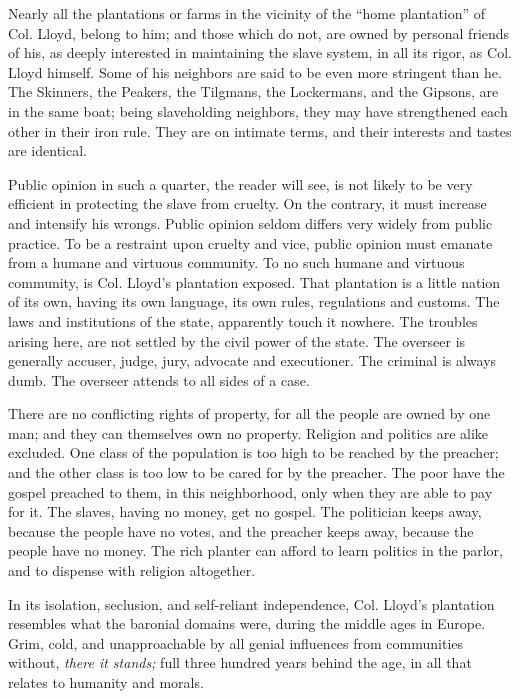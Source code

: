 Nearly all the plantations or farms in the vicinity of the ``home
plantation'' of Col. Lloyd, belong to him; and those which do not, are
owned by personal friends of his, as deeply interested in maintaining
the slave system, in all its rigor, as Col. Lloyd himself. Some of his
neighbors are said to be even more stringent than he. The Skinners, the
Peakers, the Tilgmans, the Lockermans, and the Gipsons, are in the same
boat; being slaveholding neighbors, they may have strengthened each
other in their iron rule. They are on intimate terms, and their
interests and tastes are identical.

Public opinion in such a quarter, the reader will see, is not likely to
be very efficient in protecting the slave from cruelty. On the contrary,
it must increase and intensify his wrongs. Public opinion seldom differs
very widely from public practice. To be a restraint upon cruelty and
vice, public opinion must emanate from a humane and virtuous community.
To no such {\protect\hypertarget{64}{}{}}humane and virtuous community,
is Col. Lloyd's plantation exposed. That plantation is a little nation
of its own, having its own language, its own rules, regulations and
customs. The laws and institutions of the state, apparently touch it
nowhere. The troubles arising here, are not settled by the civil power
of the state. The overseer is generally accuser, judge, jury, advocate
and executioner. The criminal is always dumb. The overseer attends to
all sides of a case.

There are no conflicting rights of property, for all the people are
owned by one man; and they can themselves own no property. Religion and
politics are alike excluded. One class of the population is too high to
be reached by the preacher; and the other class is too low to be cared
for by the preacher. The poor have the gospel preached to them, in this
neighborhood, only when they are able to pay for it. The slaves, having
no money, get no gospel. The politician keeps away, because the people
have no votes, and the preacher keeps away, because the people have no
money. The rich planter can afford to learn politics in the parlor, and
to dispense with religion altogether.

In its isolation, seclusion, and self-reliant independence, Col. Lloyd's
plantation resembles what the baronial domains were, during the middle
ages in Europe. Grim, cold, and unapproachable by all genial influences
from communities without, \emph{there it stands;} full three hundred
years behind the age, in all that relates to humanity and morals.


